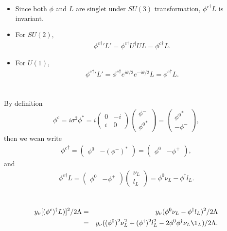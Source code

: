 \documentclass[11pt]{article}
\begin{document}
\section{ }
\begin{itemize}
  \item Since both $\phi$ and $L$ are singlet under $SU(3)$ transformation, ${\phi^c}^\dagger L$ is invariant.
  \item For $SU(2)$,
  \begin{eqnarray}
    {{\phi^c}^\dagger}' L'= {\phi^c}^\dagger U^\dagger U L={\phi^c}^\dagger L.
  \end{eqnarray}
  \item For $U(1)$,
  \begin{eqnarray}
    {{\phi^c}^\dagger}' L'= {\phi^c}^\dagger e^{i\theta/2} e^{-i\theta/2} L={\phi^c}^\dagger L.
  \end{eqnarray}
\end{itemize}

\section{ }
By definition
\begin{eqnarray}
  \phi^c=i \sigma^2 \phi^* = i 
  \begin{pmatrix}
    0 & -i \\ i & 0
  \end{pmatrix}
  \begin{pmatrix}
    \phi^- \\ {\phi^0}^*
  \end{pmatrix}
  =
  \begin{pmatrix}
    {\phi^0}^* \\ -\phi^- 
  \end{pmatrix},
\end{eqnarray}
then we wcan write
\begin{eqnarray}
  {\phi^c}^\dagger = 
  \begin{pmatrix}
    \phi^0 & -(\phi^-)^*
  \end{pmatrix}
  =
  \begin{pmatrix}
    \phi^0 & -\phi^+
  \end{pmatrix},
\end{eqnarray}
and
\begin{eqnarray}
  {\phi^c}^\dagger L 
  =
  \begin{pmatrix}
    \phi^0 & -\phi^+
  \end{pmatrix}
  \begin{pmatrix}
    \nu_L \\ l_L
  \end{pmatrix}
  = \phi^0 \nu_L - \phi^\dagger l_L.
\end{eqnarray}

\section{ }
\begin{eqnarray}
  y_\nu [ (\phi^c)^\dagger L) ]^2/2\Lambda &=& y_\nu (\phi^0 \nu_L - \phi^\dagger l_L)^2/2\Lambda\\
  &=& y_\nu((\phi^0)^2 \nu_L^2+ (\phi^\dagger)^2 l_L^2 -2 \phi^0\phi^\dagger\nu_L\l_L)/2\Lambda.
\end{eqnarray}
\end{document}
